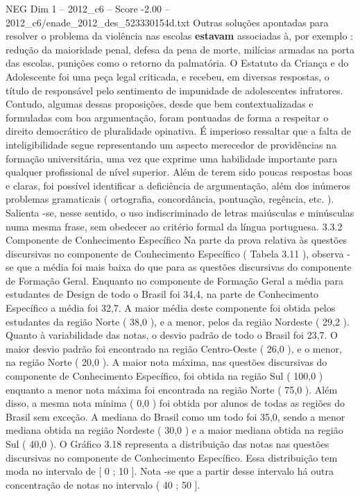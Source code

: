 \begin{textsample}{NEG Dim 1 – 2012\_c6 – Score -2.00 – 2012\_c6/enade\_2012\_des\_523330154d.txt}
Outras soluções apontadas para resolver o problema da violência nas escolas \textbf{estavam} associadas à, por exemplo : redução da maioridade penal, defesa da pena de morte, milícias armadas na porta das escolas, punições como o retorno da palmatória.
O Estatuto da Criança e do Adolescente foi uma peça legal criticada, e recebeu, em diversas respostas, o título de responsável pelo sentimento de impunidade de adolescentes infratores.
Contudo, algumas dessas proposições, desde que bem contextualizadas e formuladas com boa argumentação, foram pontuadas de forma a respeitar o direito democrático de pluralidade opinativa.
É imperioso ressaltar que a falta de inteligibilidade segue representando um aspecto merecedor de providências na formação universitária, uma vez que exprime uma habilidade importante para qualquer profissional de nível superior.
Além de terem sido poucas respostas boas e claras, foi possível identificar a deficiência de argumentação, além dos inúmeros problemas gramaticais ( ortografia, concordância, pontuação, regência, etc. ).
Salienta -se, nesse sentido, o uso indiscriminado de letras maiúsculas e minúsculas numa mesma frase, sem obedecer ao critério formal da língua portuguesa. 3.3.2 Componente de Conhecimento Específico Na parte da prova relativa às questões discursivas no componente de Conhecimento Específico ( Tabela 3.11 ), observa -se que a média foi mais baixa do que para as questões discursivas do componente de Formação Geral.
Enquanto no componente de Formação Geral a média para estudantes de Design de todo o Brasil foi 34,4, na parte de Conhecimento Específico a média foi 32,7.
A maior média deste componente foi obtida pelos estudantes da região Norte ( 38,0 ), e a menor, pelos da região Nordeste ( 29,2 ).
Quanto à variabilidade das notas, o desvio padrão de todo o Brasil foi 23,7.
O maior desvio padrão foi encontrado na região Centro-Oeste ( 26,0 ), e o menor, na região Norte ( 20,0 ).
A maior nota máxima, nas questões discursivas do componente de Conhecimento Específico, foi obtida na região Sul ( 100,0 ) enquanto a menor nota máxima foi encontrada na região Norte ( 75,0 ).
Além disso, a mesma nota mínima ( 0,0 ) foi obtida por alunos de todas as regiões do Brasil sem exceção.
A mediana do Brasil como um todo foi 35,0, sendo a menor mediana obtida na região Nordeste ( 30,0 ) e a maior mediana obtida na região Sul ( 40,0 ).
O Gráfico 3.18 representa a distribuição das notas nas questões discursivas no componente de Conhecimento Específico.
Essa distribuição tem moda no intervalo de [ 0 ; 10 ].
Nota -se que a partir desse intervalo há outra concentração de notas no intervalo ( 40 ; 50 ].

\end{textsample}
